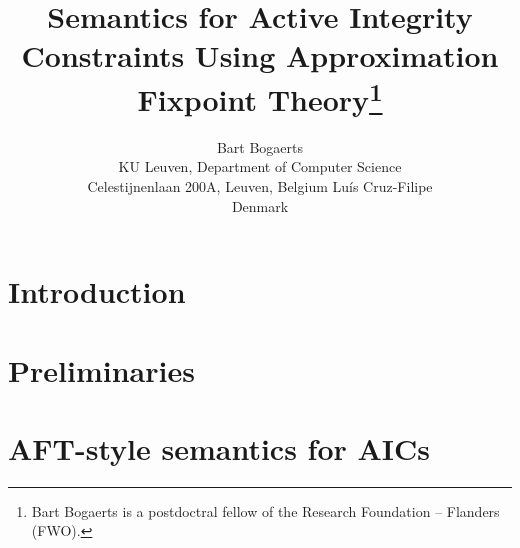 \documentclass{article}
\title{Semantics for Active Integrity Constraints Using Approximation Fixpoint Theory\thanks{Bart Bogaerts is a postdoctral fellow of the Research Foundation -- Flanders (FWO). 	}}
\author{Bart Bogaerts \\
KU Leuven, Department of Computer Science\\
Celestijnenlaan 200A, Leuven, Belgium 
\And 
Lu\'is Cruz-Filipe\\
Denmark}
\begin{document}
\maketitle




\section{Introduction}


\section{Preliminaries}


\section{AFT-style semantics for AICs}




\end{document}
